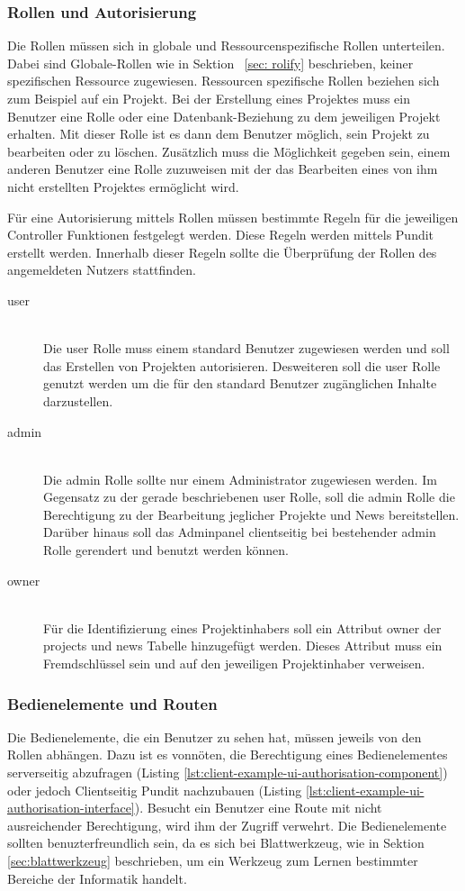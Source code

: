 \subsubsection{Rollen und Autorisierung}
Die Rollen müssen sich in globale und Ressourcenspezifische Rollen unterteilen. Dabei sind Globale-Rollen wie in Sektion ~\ref{sec: rolify} beschrieben, keiner spezifischen Ressource zugewiesen. Ressourcen spezifische Rollen beziehen sich zum Beispiel auf ein Projekt. Bei der Erstellung eines Projektes muss ein Benutzer eine Rolle oder eine Datenbank-Beziehung zu dem jeweiligen Projekt erhalten. Mit dieser Rolle ist es dann dem Benutzer möglich, sein Projekt zu bearbeiten oder zu löschen. Zusätzlich muss die Möglichkeit gegeben sein, einem anderen Benutzer eine Rolle zuzuweisen mit der das Bearbeiten eines von ihm nicht erstellten Projektes ermöglicht wird.

Für eine Autorisierung mittels Rollen müssen bestimmte Regeln für die jeweiligen Controller Funktionen festgelegt werden. Diese Regeln werden mittels Pundit erstellt werden. Innerhalb dieser Regeln sollte die Überprüfung der Rollen des angemeldeten Nutzers stattfinden.


\begin{description}
	\item[user]\hfill\\
	Die user Rolle muss einem standard Benutzer zugewiesen werden und soll das Erstellen von Projekten autorisieren. Desweiteren soll die user Rolle genutzt werden um die für den standard Benutzer zugänglichen Inhalte darzustellen.
	\item[admin]\hfill\\
	Die admin Rolle sollte nur einem Administrator zugewiesen werden. Im Gegensatz zu der gerade beschriebenen user Rolle, soll die admin Rolle die Berechtigung zu der Bearbeitung jeglicher Projekte und News bereitstellen. Darüber hinaus soll das Adminpanel clientseitig bei bestehender admin Rolle gerendert und benutzt werden können.
	\item[owner]\hfill\\
	Für die Identifizierung eines Projektinhabers soll ein Attribut owner der projects und news Tabelle hinzugefügt werden. Dieses Attribut muss ein Fremdschlüssel sein und auf den jeweiligen Projektinhaber verweisen.
\end{description}

\subsubsection{Bedienelemente und Routen}
Die Bedienelemente, die ein Benutzer zu sehen hat, müssen jeweils von den Rollen abhängen. Dazu ist es vonnöten, die Berechtigung eines Bedienelementes serverseitig abzufragen (Listing \ref{lst:client-example-ui-authorisation-component}) oder jedoch Clientseitig Pundit nachzubauen (Listing \ref{lst:client-example-ui-authorisation-interface}). Besucht ein Benutzer eine Route mit nicht ausreichender Berechtigung, wird ihm der Zugriff verwehrt. Die Bedienelemente sollten benuzterfreundlich sein, da es sich bei Blattwerkzeug, wie in Sektion \ref{sec:blattwerkzeug} beschrieben, um ein Werkzeug zum Lernen bestimmter Bereiche der Informatik handelt.

